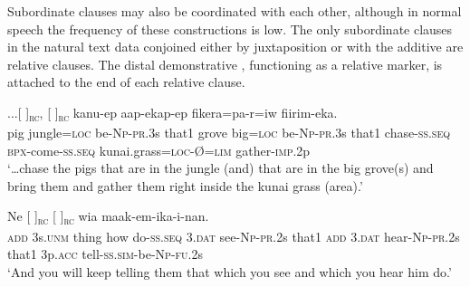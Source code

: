 Subordinate clauses may also be coordinated with each other, although in normal speech the frequency of these constructions is low. The only subordinate clauses in the natural text data conjoined either by juxtaposition or with the additive  are relative clauses. The distal demonstrative , functioning as a relative marker, is attached to the end of each relative clause.

\ea%
\label{ex:8:x1381}
\gll ...[      ]\textsubscript{\textsc{rc}}, [  
  ]\textsubscript{\textsc{rc}}  kanu-ep  aap-ekap-ep fikera=pa-r=iw  fiirim-eka.\\
pig  jungle=\textsc{loc} be-\textsc{Np}-\textsc{pr}.3s that1 grove  big=\textsc{loc} be-\textsc{Np}-\textsc{pr}.3s that1 chase-\textsc{ss}.\textsc{seq} \textsc{\textsc{bp}x}-come-\textsc{ss}.\textsc{seq} kunai.grass=\textsc{loc}-{\O}=\textsc{lim} gather-\textsc{imp}.2p\\
\glt`{\dots}chase the pigs that are in the jungle (and) that are in the big grove(s) and bring them and gather them right inside the kunai grass (area).'
\z


\ea%
\label{ex:8:x1382}
\gll Ne [       ]\textsubscript{\textsc{rc}}   [  ]\textsubscript{\textsc{rc}} wia  maak-em-ika-i-nan.\\
\textsc{add} 3s.\textsc{unm} thing  how  do-\textsc{ss}.\textsc{seq} 3.\textsc{dat} see-\textsc{Np}-\textsc{pr}.2s that1 \textsc{add} 3.\textsc{dat} hear-\textsc{Np}-\textsc{pr}.2s that1 3p.\textsc{acc} tell-\textsc{ss}.\textsc{sim}-be-\textsc{Np}-\textsc{fu}.2s\\
\glt`And you will keep telling them that which you see and which you hear him do.'
\z


